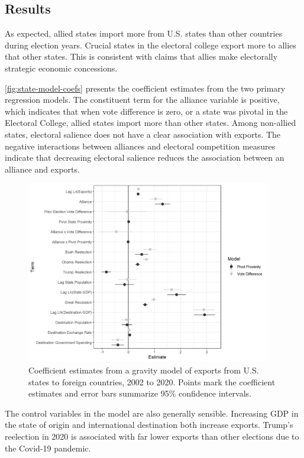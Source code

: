 \documentclass[12pt]{article}
\begin{document}
\subsection{Results}

As expected, allied states import more from U.S. states than other countries during election years. 
Crucial states in the electoral college export more to allies that other states. 
This is consistent with claims that allies make electorally strategic economic concessions. 


\autoref{fig:state-model-coefs} presents the coefficient estimates from the two primary regression models. 
The constituent term for the alliance variable is positive, which indicates that when vote difference is zero, or a state was pivotal in the Electoral College, allied states import more than other states. 
Among non-allied states, electoral salience does not have a clear association with exports. 
The negative interactions between alliances and electoral competition measures indicate that decreasing electoral salience reduces the association between an alliance and exports. 



\begin{figure}[htpb]
	\centering
		\includegraphics[width=0.95\textwidth]{../figures/state-model-coefs.png}
	\caption{Coefficient estimates from a gravity model of exports from U.S. states to foreign countries, 2002 to 2020. Points mark the coefficient estimates and error bars summarize 95\% confidence intervals.}
	\label{fig:state-model-coefs}
\end{figure}


The control variables in the model are also generally sensible. 
Increasing GDP in the state of origin and international destination both increase exports. 
Trump's reelection in 2020 is associated with far lower exports than other elections due to the Covid-19 pandemic. 
\end{document}
